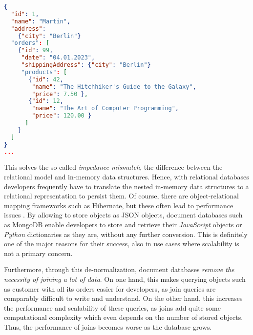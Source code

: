\begin{lstlisting}[language=JSON, caption=JSON Document, captionpos=b, label=lst:JSONDocument]
{
  "id": 1,
  "name": "Martin",
  "address": 
    {"city": "Berlin"}
  "orders": [
    {"id": 99,
     "date": "04.01.2023",
     "shippingAddress": {"city": "Berlin"}
     "products": [
       {"id": 42,
        "name": "The Hitchhiker's Guide to the Galaxy",
        "price": 7.50 },
       {"id": 12,
        "name": "The Art of Computer Programming",
        "price": 120.00 }
      ]
    }
  ]
}
...
\end{lstlisting}


This solves the so called \emph{impedance mismatch}, the difference between the relational model and in-memory data structures. Hence, with relational databases developers frequently have to translate the nested in-memory data structures to a relational representation to persist them. Of course, there are object-relational mapping frameworks such as Hibernate, but these often lead to performance issues \cite{NoSQLDistilled}. By allowing to store objects as JSON objects, document databases such as MongoDB enable developers to store and retrieve their \emph{JavaScript} objects or \emph{Python} dictionaries as they are, without any further conversion. This is definitely one of the major reasons for their success, also in use cases where scalability is not a primary concern.\par
Furthermore, through this de-normalization, document databases \emph{remove the necessity of joining a lot of data}. On one hand, this makes querying objects such as customer with all its orders easier for developers, as join queries are comparably difficult to write and understand. On the other hand, this increases the performance and scalability of these queries, as joins add quite some computational complexity which even depends on the number of stored objects. Thus, the performance of joins becomes worse as the database grows.\par
